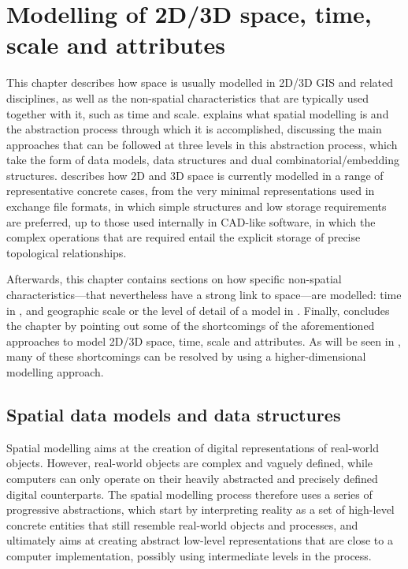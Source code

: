 
\chapter{Modelling of 2D/3D space, time, scale and attributes}
\label{ch:modelling-background}

This chapter describes how space is usually modelled in 2D/3D GIS and related disciplines, as well as the non-spatial characteristics that are typically used together with it, such as time and scale.
 explains what spatial modelling is and the abstraction process through which it is accomplished, discussing the main approaches that can be followed at three levels in this abstraction process, which take the form of data models, data structures and dual combinatorial/embedding structures.
 describes how 2D and 3D space is currently modelled in a range of representative concrete cases, from the very minimal representations used in exchange file formats, in which simple structures and low storage requirements are preferred, up to those used internally in CAD-like software, in which the complex operations that are required entail the explicit storage of precise topological relationships.

Afterwards, this chapter contains sections on how specific non-spatial characteristics---that nevertheless have a strong link to space---are modelled: time in , and geographic scale or the level of detail of a model in .
Finally,  concludes the chapter by pointing out some of the shortcomings of the aforementioned approaches to model 2D/3D space, time, scale and attributes.
As will be seen in , many of these shortcomings can be resolved by using a higher-dimensional modelling approach.

\section{Spatial data models and data structures}
\label{se:spatial-modelling}

Spatial modelling aims at the creation of digital representations of real-world objects.
However, real-world objects are complex and vaguely defined, while computers can only operate on their heavily abstracted and precisely defined digital counterparts.
The spatial modelling process therefore uses a series of progressive abstractions, which start by interpreting reality as a set of high-level concrete entities that still resemble real-world objects and processes, and ultimately aims at creating abstract low-level representations that are close to a computer implementation, possibly using intermediate levels in the process.

